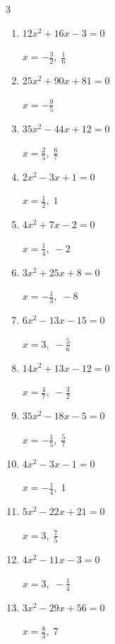 \begin{multicols}{3}
\begin{enumerate}
        $\displaystyle x=-\frac{3}{7},\; 1$

  \item $12x^{2}+16x-3=0$

        $\displaystyle x=-\frac{3}{2},\; \frac{1}{6}$

  \item $25x^{2}+90x+81=0$

        $\displaystyle x=-\frac{9}{5}$

  \item $35x^{2}-44x+12=0$

        $\displaystyle x=\frac{2}{5},\; \frac{6}{7}$

  \item $2x^{2}-3x+1=0$

        $\displaystyle x=\frac{1}{2},\; 1$

  \item $4x^{2}+7x-2=0$

        $\displaystyle x=\frac{1}{4},\; -2$

  \item $3x^{2}+25x+8=0$

        $\displaystyle x=-\frac{1}{3},\; -8$

\columnbreak %

  \item $6x^{2}-13x-15=0$

        $\displaystyle x=3,\; -\frac{5}{6}$

  \item $14x^{2}+13x-12=0$

        $\displaystyle x=\frac{4}{7},\; -\frac{3}{2}$

  \item $35x^{2}-18x-5=0$

        $\displaystyle x=-\frac{1}{5},\; \frac{5}{7}$

  \item $4x^{2}-3x-1=0$

        $\displaystyle x=-\frac{1}{4},\; 1$

  \item $5x^{2}-22x+21=0$

        $\displaystyle x=3,\; \frac{7}{5}$

  \item $4x^{2}-11x-3=0$

        $\displaystyle x=3,\; -\frac{1}{4}$

  \item $3x^{2}-29x+56=0$

        $\displaystyle x=\frac{8}{3},\; 7$


\end{enumerate}
\end{multicols}
